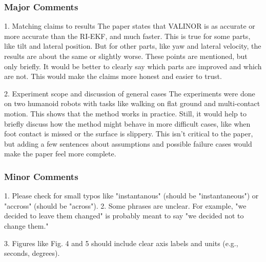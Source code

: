 \subsubsection{Major Comments}

\begin{revquote}
1. Matching claims to results
The paper states that VALINOR is as accurate or more accurate than the RI-EKF, and much faster. This is true for some parts, like tilt and lateral position. But for other parts, like yaw and lateral velocity, the results are about the same or slightly worse. These points are mentioned, but only briefly. It would be better to clearly say which parts are improved and which are not. This would make the claims more honest and easier to trust.
\end{revquote}

\begin{revquote}
2. Experiment scope and discussion of general cases
The experiments were done on two humanoid robots with tasks like walking on flat ground and multi-contact motion. This shows that the method works in practice. Still, it would help to briefly discuss how the method might behave in more difficult cases, like when foot contact is missed or the surface is slippery. This isn't critical to the paper, but adding a few sentences about assumptions and possible failure cases would make the paper feel more complete.
\end{revquote}

\subsubsection{Minor Comments}
\begin{revquote}
1. Please check for small typos like "instantanous" (should be "instantaneous") or "accross" (should be "across").
2. Some phrases are unclear. For example, "we decided to leave them changed" is probably meant to say "we decided not to change them."
\end{revquote}

\begin{revquote}
3. Figures like Fig. 4 and 5 should include clear axis labels and units (e.g., seconds, degrees).
\end{revquote}